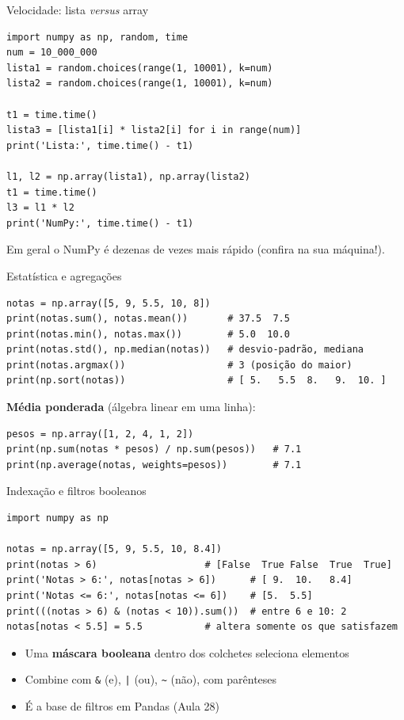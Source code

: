 \documentclass[aspectratio=169,10pt,t]{beamer}
\begin{document}
\begin{frame}[fragile]{Velocidade: lista \emph{versus} array}
\begin{lstlisting}
import numpy as np, random, time
num = 10_000_000
lista1 = random.choices(range(1, 10001), k=num)
lista2 = random.choices(range(1, 10001), k=num)

t1 = time.time()
lista3 = [lista1[i] * lista2[i] for i in range(num)]
print('Lista:', time.time() - t1)

l1, l2 = np.array(lista1), np.array(lista2)
t1 = time.time()
l3 = l1 * l2
print('NumPy:', time.time() - t1)
\end{lstlisting}
  \small Em geral o NumPy é dezenas de vezes mais rápido (confira na sua máquina!).\\
\end{frame}

\begin{frame}[fragile]{Estatística e agregações}
\begin{lstlisting}
notas = np.array([5, 9, 5.5, 10, 8])
print(notas.sum(), notas.mean())       # 37.5  7.5
print(notas.min(), notas.max())        # 5.0  10.0
print(notas.std(), np.median(notas))   # desvio-padrão, mediana
print(notas.argmax())                  # 3 (posição do maior)
print(np.sort(notas))                  # [ 5.   5.5  8.   9.  10. ]
\end{lstlisting}
  \textbf{Média ponderada} (álgebra linear em uma linha):
\begin{lstlisting}
pesos = np.array([1, 2, 4, 1, 2])
print(np.sum(notas * pesos) / np.sum(pesos))   # 7.1
print(np.average(notas, weights=pesos))        # 7.1
\end{lstlisting}
\end{frame}

\begin{frame}[fragile]{Indexação e filtros booleanos}
\begin{lstlisting}
import numpy as np
	
notas = np.array([5, 9, 5.5, 10, 8.4])
print(notas > 6)                   # [False  True False  True  True]
print('Notas > 6:', notas[notas > 6])      # [ 9.  10.   8.4]
print('Notas <= 6:', notas[notas <= 6])    # [5.  5.5]
print(((notas > 6) & (notas < 10)).sum())  # entre 6 e 10: 2
notas[notas < 5.5] = 5.5           # altera somente os que satisfazem
\end{lstlisting}
  \begin{itemize}
    \item Uma \textbf{máscara booleana} dentro dos colchetes seleciona elementos
    \item Combine com \texttt{\&} (e), \texttt{|} (ou), \texttt{\textasciitilde} (não), \alert{com parênteses}
    \item É a base de filtros em Pandas (Aula 28)
  \end{itemize}
\end{frame}
\end{document}
